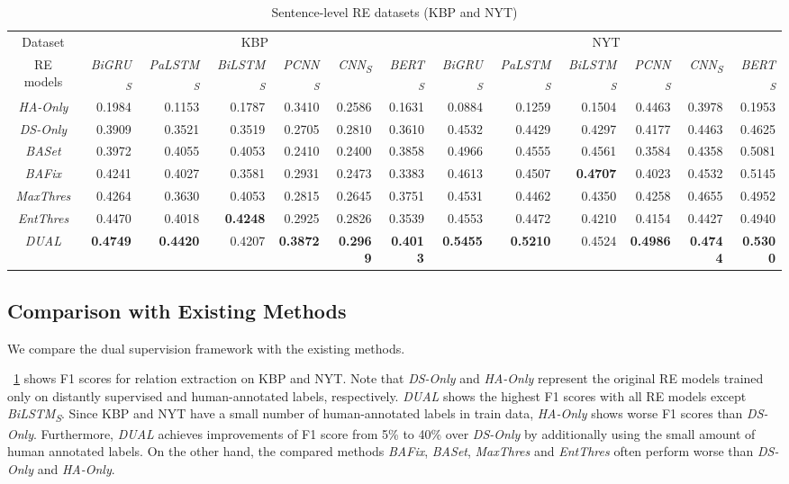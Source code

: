 \documentclass[11pt]{article}
\newcommand{\minisection}[1]{\vspace{0.03in}{\bf \noindent #1.} }
\newcommand{\sbilstm}{\emph{BiLSTM\textsubscript{S}}\xspace}
\newcommand{\scnn}{\emph{CNN\textsubscript{S}}\xspace}
\newcommand{\sbigru}{\emph{BiGRU\textsubscript{S}}\xspace}
\newcommand{\spcnn}{\emph{PCNN\textsubscript{S}}\xspace}
\newcommand{\spalstm}{\emph{PaLSTM\textsubscript{S}}\xspace}
\newcommand{\sbert}{\emph{BERT\textsubscript{S}}\xspace}
\newcommand{\dual}{\emph{DUAL}\xspace}
\newcommand{\bafix}{\emph{BAFix}\xspace}
\newcommand{\baset}{\emph{BASet}\xspace}
\newcommand{\maxth}{\emph{MaxThres}\xspace}
\newcommand{\entth}{\emph{EntThres}\xspace}
\newcommand{\dsonly}{\emph{DS-Only}\xspace}
\newcommand{\haonly}{\emph{HA-Only}\xspace}
\begin{document}
\begin{table}[tb]
	\center
	\caption{Sentence-level RE datasets (KBP and NYT)\label{tab:performance_sentence}}
	\scriptsize
	\begin{tabular}{c|rrrrrr|rrrrrr}
\toprule
Dataset  &  \multicolumn{6}{c|}{KBP}  &  \multicolumn{6}{c}{NYT}\\
RE models & \sbigru & \spalstm & \sbilstm & \spcnn & \scnn & \sbert & \sbigru & \spalstm & \sbilstm & \spcnn & \scnn & \sbert\\
\midrule
\midrule
\haonly & 0.1984 & 0.1153 & 0.1787 & 0.3410 & 0.2586 & 0.1631 & 0.0884 & 0.1259 & 0.1504 & 0.4463 & 0.3978 & 0.1953\\
\dsonly & 0.3909 & 0.3521 & 0.3519 & 0.2705 & 0.2810 & 0.3610 & 0.4532 & 0.4429 & 0.4297 & 0.4177 & 0.4463 & 0.4625\\
\midrule
\baset & 0.3972 & 0.4055 & 0.4053 & 0.2410 & 0.2400 & 0.3858 & 0.4966 & 0.4555 & 0.4561 & 0.3584 & 0.4358 & 0.5081\\
\bafix & 0.4241 & 0.4027 & 0.3581 & 0.2931 & 0.2473 & 0.3383 & 0.4613 & 0.4507 & \textbf{0.4707} & 0.4023 & 0.4532 & 0.5145\\
\maxth & 0.4264 & 0.3630 & 0.4053 & 0.2815 & 0.2645 & 0.3751 & 0.4531 & 0.4462 & 0.4350 & 0.4258 & 0.4655 & 0.4952\\
\entth & 0.4470 & 0.4018 & \textbf{0.4248} & 0.2925 & 0.2826 & 0.3539 & 0.4553 & 0.4472 & 0.4210 & 0.4154 & 0.4427 & 0.4940\\
\midrule
\dual & \textbf{0.4749} & \textbf{0.4420} & 0.4207 & \textbf{0.3872}  & \textbf{0.2969} & \textbf{0.4013}& \textbf{0.5455} & \textbf{0.5210} & 0.4524 & \textbf{0.4986} & \textbf{0.4744}& \textbf{0.5300}\\
\bottomrule
	\end{tabular}
\end{table}





\subsection{Comparison with Existing Methods}
We compare the dual supervision framework with the existing methods. 

\minisection{Sentence-level RE}
\tablename~\ref{tab:performance_sentence} shows F1 scores for relation extraction on KBP and NYT.
Note that \dsonly and \haonly represent the original RE models trained only on distantly supervised and human-annotated labels, respectively.
\dual shows the highest F1 scores with all RE models except \sbilstm.
Since KBP and NYT have a small number of human-annotated labels in train data, \haonly shows worse F1 scores than \dsonly.
Furthermore, \dual achieves improvements of F1 score from 5\% to 40\% over \dsonly by additionally using the small amount of human annotated labels.
On the other hand, the compared methods \bafix, \baset, \maxth and \entth often perform worse than \dsonly and \haonly.
\end{document}
